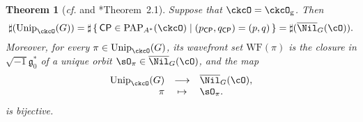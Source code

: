 \documentclass[12pt,a4paper]{amsart}
\newcommand{\WF}{\mathrm{WF}}
\newcommand{\CP}{{\mathcal {P}}}
\newcommand{\g}{\mathfrak g}
\numberwithin{equation}{section}
\newtheorem{thm}{Theorem}[section]
\theoremstyle{remark}
\def\cf{\emph{cf.} }
\def\Unip{\mathrm{Unip}}
\def\CP{\mathsf{CP}}
\begin{document}
\begin{thm}[\cf {\cite[Theorem 4.2]{BV.W} and \cite{Tr.H}*{Theorem~2.1}}]\label{thmunit0}
  Suppose that $\ckcO = \ckcO_{\mathrm g}$. Then
  \begin{equation} \label{sharpuni0} \sharp(\Unip_{\ckcO}(G))= \sharp \set{\CP\in \mathrm{PAP}_{A^*}(\ckcO)|(p_\CP, q_\CP)=(p,q)}=\sharp(\overline \Nil_{G}(\cO)).
  \end{equation}
  Moreover, for every $\pi\in \Unip_{\ckcO}(G)$, its wavefront set $\WF(\pi)$ is
  the closure in $\sqrt{-1}\g_0^*$ of a unique orbit
  $\sO_\pi\in \overline \Nil_{G}(\cO)$, and the map
  \begin{equation}\label{sharpuni1}
    \begin{array}{rcl}
      \Unip_{\ckcO}(G) &\longrightarrow& \overline \Nil_{G}(\cO), \\%
      \pi & \mapsto & \sO_\pi.
    \end{array}
  \end{equation}
  is bijective.
\end{thm}
\end{document}
